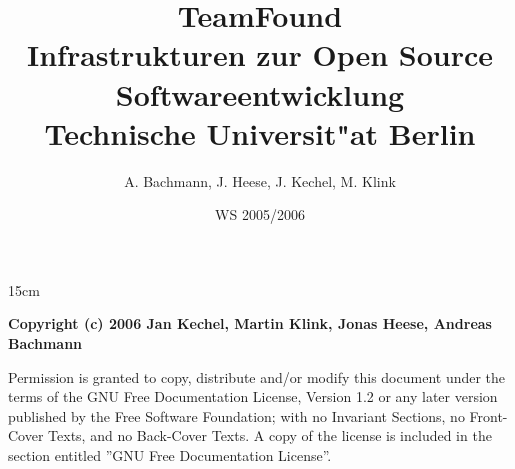 \documentclass[12pt,a4paper]{report}
\begin{document}
{}
%
\title{TeamFound\\Infrastrukturen zur Open Source Softwareentwicklung\\Technische Universit"at Berlin}
\author{A. Bachmann, J. Heese, J. Kechel, M. Klink}
\date{WS 2005/2006}
%
\maketitle
%
\begin{parbox}[b][17cm][s]{15cm}

\textbf{Copyright (c) 2006 Jan Kechel, Martin Klink, Jonas Heese, Andreas Bachmann}

Permission is granted to copy, distribute and/or modify this document
under the terms of the GNU Free Documentation License, Version 1.2
or any later version published by the Free Software Foundation;
with no Invariant Sections, no Front-Cover Texts, and no Back-Cover
Texts.  A copy of the license is included in the section entitled ''GNU
Free Documentation License''.
\end{parbox}

%
\tableofcontents
\listoffigures
\cleardoublepage
%
%
%




\begin{appendix}

%
\clearpage
{}
\printindex
\end{appendix}
%
\end{document}
